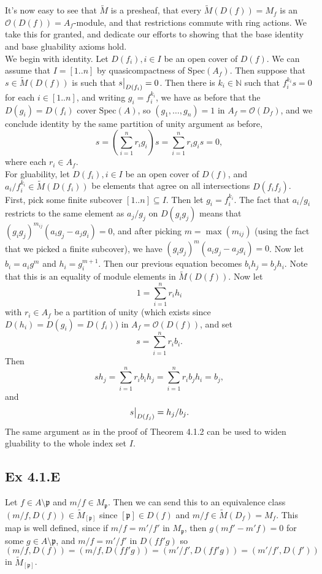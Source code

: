 \documentclass{article}
\newcommand\restr[2]{{%
  \left.\kern-\nulldelimiterspace %
  #1 %
  \vphantom{\big|} %
  \right|_{#2} %
  }}
\theoremstyle{definition}
\newcommand{\N}{\mathbb{N}}
\newcommand{\Spec}{\text{Spec}}
\begin{document}
It's now easy to see that $\widetilde{M}$ is a presheaf, that every
$\widetilde{M}(D(f)) = M_f$ is an $\mathcal{O}(D(f)) = A_f$-module, and that
restrictions commute with ring actions. We take this for granted, and dedicate
our efforts to showing that the base identity and base gluability axioms hold.
\\

We begin with identity. Let $D(f_i), i \in I$ be an open cover of $D(f)$. We
can assume that $I = [1..n]$ by quasicompactness of $\Spec(A_f)$. Then suppose
that $s \in \widetilde{M}(D(f))$ is such that $\restr{s}{D(f_i)} = 0$. Then
there is $k_i \in \N$ such that $f_i^{k_i} s = 0$ for each $i \in [1..n]$, and
writing $g_i = f_i^{k_i}$, we have as before that the $D(g_i) = D(f_i)$ cover
$\Spec(A)$, so $(g_1, \ldots, g_n) = 1$ in $A_f = \mathcal{O}(D_f)$, and we
conclude identity by the same partition of unity argument as before,
\[
	s
	=
	\left(\sum_{i = 1}^{n} r_i g_i\right)s
	=
	\sum_{i = 1}^{n} r_i g_i s
	=
	0,
\] 
where each $r_i \in A_f$. \\

For gluability, let $D(f_i), i \in I$ be an open cover of $D(f)$, and
$a_i/f_i^{k_i} \in \widetilde{M}(D(f_i))$ be elements that agree on all
intersections $D(f_i f_j)$. First, pick some finite subcover $[1..n] \subseteq
I$. Then let $g_i = f_i^{k_i}$. The fact that $a_i/g_i$ restricts to the same
element as $a_j/g_j$ on $D(g_i g_j)$ means that $(g_i g_j)^{m_{ij}} (a_i g_j -
a_j g_i) = 0$, and after picking $m = \max(m_{ij})$ (using the fact that we
picked a finite subcover), we have $(g_i g_j)^{m} (a_i g_j - a_j g_i) = 0$. Now
let $b_i = a_i g^m$ and $h_i = g_i^{m + 1}$. Then our previous equation becomes
$b_i h_j = b_j h_i$. Note that this is an equality of module elements in
$\widetilde{M}(D(f))$. Now let 
\[
	1 = \sum_{i = 1}^{n} r_i h_i
\] 
with $r_i \in A_f$ be a partition of unity (which exists since $D(h_i) = D(g_i)
= D(f_i)$) in $A_f = \mathcal{O}(D(f))$, and set 
\[
	s
	=
	\sum_{i = 1}^{n} r_i b_i.
\] 
Then
\[
	s h_j
	=
	\sum_{i = 1}^{n} r_i b_i h_j
	=
	\sum_{i = 1}^{n} r_i b_j h_i
	=
	b_j,
\] 
and
\[
	\restr{s}{D(f_j)}
	=
	h_j/b_j.
\] 
The same argument as in the proof of Theorem 4.1.2 can be used to widen
gluability to the whole index set $I$.


\subsection*{Ex 4.1.E}

Let $f \in A \setminus \mathfrak{p}$ and $m/f \in M_{\mathfrak{p}}$. Then we
can send this to an equivalence class $(m/f, D(f)) \in
\widetilde{M}_{[\mathfrak{p}]}$ since $[\mathfrak{p}] \in D(f)$ and $m/f \in
\widetilde{M}(D_f) = M_f$. This map is well defined, since if $m/f = m'/f'$ in
$M_{\mathfrak{p}}$, then $g(mf' - m'f) = 0$ for some $g \in A \setminus
\mathfrak{p}$, and $m/f = m'/f'$ in $D(ff'g)$ so
\[
	(m/f, D(f)) = (m/f, D(ff'g)) = (m'/f', D(ff'g)) = (m'/f', D(f'))
\]
in $\widetilde{M}_{[\mathfrak{p}]}$.
\end{document}
